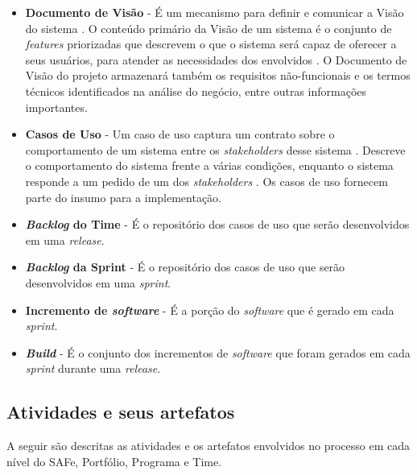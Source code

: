 \begin{itemize}
     \item \textbf{Documento de Visão} - É um mecanismo para definir e comunicar a Visão do sistema \cite{leffingwell11}.
      O conteúdo primário da Visão de um sistema é o conjunto de \textit{features} priorizadas que descrevem o que o sistema
      será capaz de oferecer a seus usuários, para atender as necessidades dos envolvidos \cite{leffingwell11}.
      O Documento de Visão do projeto armazenará também os requisitos não-funcionais e os termos técnicos identificados na
      análise do negócio, entre outras informações importantes.
 
     \item \textbf{Casos de Uso} - Um caso de uso captura um contrato sobre o comportamento de um sistema
      entre os \textit{stakeholders} desse sistema \cite{cockburn01}.
      Descreve o comportamento do sistema frente a várias condições, enquanto o sistema responde a
      um pedido de um dos \textit{stakeholders} \cite{cockburn01}. Os casos de uso fornecem parte do insumo para a implementação.
      
     \item \textbf{\textit{Backlog} do Time} - É o repositório dos casos de uso que serão desenvolvidos em uma \textit{release}.
     
     \item \textbf{\textit{Backlog} da Sprint} - É o repositório dos casos de uso que serão desenvolvidos em uma \textit{sprint}.
     
     \item \textbf{Incremento de \textit{software}} - É a porção do \textit{software} que é gerado em cada \textit{sprint}.
     
     \item \textbf{\textit{Build}} - É o conjunto dos incrementos de \textit{software} que foram gerados em cada \textit{sprint}
      durante uma \textit{release}.
     
    \end{itemize}

  \subsection{Atividades e seus artefatos}
    
    A seguir são descritas as atividades e os artefatos envolvidos no processo em cada nível do SAFe, Portfólio, Programa e Time.
    
    
    
    \pagebreak
    
    
    \pagebreak
    

    
    